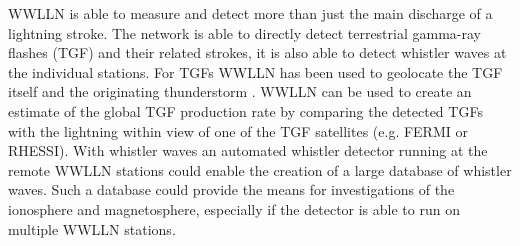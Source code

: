 WWLLN is able to measure and detect more than just the main discharge of a lightning stroke.
The network is able to directly detect terrestrial gamma-ray flashes (TGF) and their related strokes, it is also able to detect whistler waves at the individual stations.
For TGFs WWLLN has been used to geolocate the TGF itself and the originating thunderstorm \citep{Connaughton2010, Connaughton2013}.
WWLLN can be used to create an estimate of the global TGF production rate by comparing the detected TGFs with the lightning within view of one of the TGF satellites (e.g. FERMI or RHESSI).
With whistler waves an automated whistler detector running at the remote WWLLN stations could enable the creation of a large database of whistler waves.
Such a database could provide the means for investigations of the ionosphere and magnetosphere, especially if the detector is able to run on multiple WWLLN stations.







